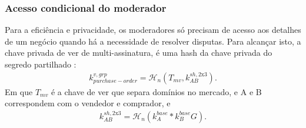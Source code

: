 \subsubsection*{Acesso condicional do moderador}

Para a eficiência e privacidade, os moderadores só precisam de acesso aos detalhes de um negócio quando há a necessidade de resolver disputas. Para alcançar isto, a chave privada de ver de multi-assinatura, é uma hash da chave privada do segredo partilhado :
\begin{align*}
k^{v,grp}_{purchase-order} = \mathcal{H}_n(T_{mv},k^{sh,\textrm{2x3}}_{AB}) .
\end{align*}    
Em que $T_{mv}$ é a chave de ver que separa domínios no mercado, e A e B correspondem com o vendedor e comprador, e   
\begin{align*}
k^{sh,\textrm{2x3}}_{AB} = \mathcal{H}_n(k^{base}_{A}*k^{base}_{B} G) .
\end{align*}

